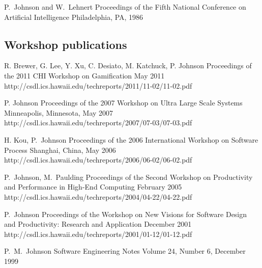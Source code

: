 \documentclass[11pt,letterpaper,sans]{moderncv} %
\begin{document}
          {P.~Johnson and W.~Lehnert}
          {Proceedings of the Fifth National Conference on Artificial Intelligence}
          {Philadelphia, PA, 1986}

\subsection{Workshop publications}

          {R. Brewer, G. Lee, Y. Xu, C. Desiato, M. Katchuck, P. Johnson}
          {Proceedings of the 2011 CHI Workshop on Gamification}
          {May 2011}
          {http://csdl.ics.hawaii.edu/techreports/2011/11-02/11-02.pdf}

          {P. Johnson}
          {Proceedings of the 2007 Workshop on Ultra Large Scale Systems}
          {Minneapolis, Minnesota, May 2007}
          {http://csdl.ics.hawaii.edu/techreports/2007/07-03/07-03.pdf}

          {H. Kou, P.~Johnson}
          {Proceedings of the 2006 International Workshop on Software Process}
          {Shanghai, China, May 2006}
          {http://csdl.ics.hawaii.edu/techreports/2006/06-02/06-02.pdf}

          {P.~Johnson, M.~Paulding}
          {Proceedings of the Second Workshop on Productivity and Performance in High-End Computing}
          {February 2005}
          {http://csdl.ics.hawaii.edu/techreports/2004/04-22/04-22.pdf}

          {P.~Johnson}
          {Proceedings of the Workshop on New Visions for Software Design and Productivity: Research and Application}
          {December 2001}
          {http://csdl.ics.hawaii.edu/techreports/2001/01-12/01-12.pdf}

          {P.~M.~Johnson}
          {Software Engineering Notes}
          {Volume 24, Number 6, December 1999}
\end{document}
